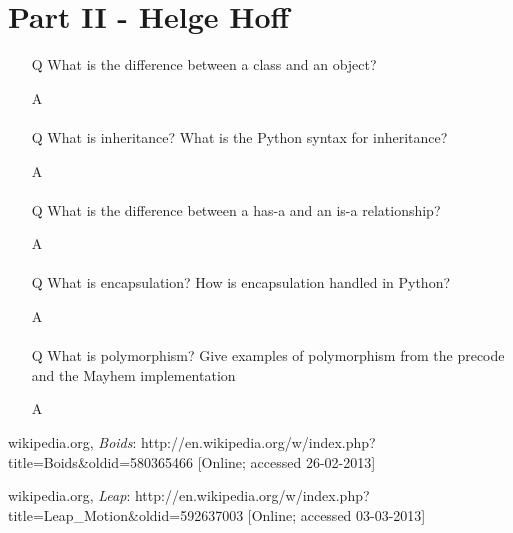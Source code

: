 \documentclass{article}
\begin{document}
\section{Part II - Helge Hoff}
\begin{itemize}
\item[Q] 
What is the difference between a class and an object?
\item[A]

\paragraph{}
\item[Q] 
What is inheritance? What is the Python syntax for inheritance?
\item[A]

\paragraph{}
\item[Q]
What is the difference between a has-a and an is-a relationship?
\item[A]

\paragraph{}
\item[Q] 
What is encapsulation? How is encapsulation handled in Python?
\item[A]

\paragraph{}
\item[Q]
What is polymorphism? Give examples of polymorphism from the precode and the Mayhem implementation
\item[A]

\end{itemize}


\begin{thebibliography}{9}

  wikipedia.org,
  \emph{Boids}:
  http://en.wikipedia.org/w/index.php?title=Boids\&oldid=580365466 
  [Online; accessed 26-02-2013]
  
  wikipedia.org,
  \emph{Leap}:
  http://en.wikipedia.org/w/index.php?title=Leap\_Motion\&oldid=592637003
  [Online; accessed 03-03-2013]
  

\end{thebibliography}
\end{document}
